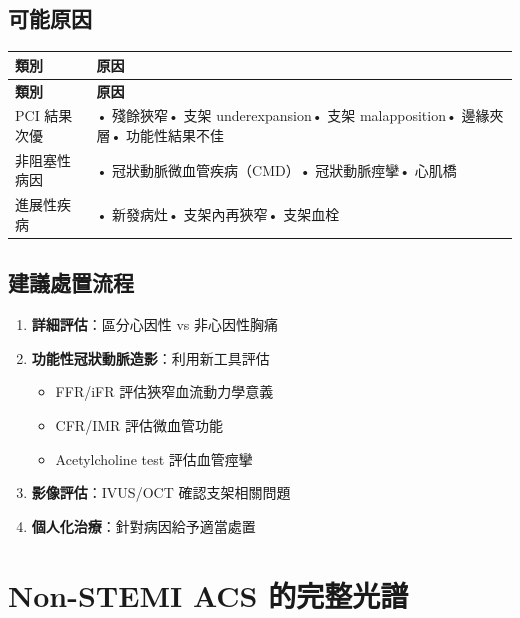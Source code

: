 \documentclass[12pt,a4paper]{article}
\begin{document}
\subsection{可能原因}

\begin{longtable}{p{4cm}p{10cm}}
\toprule
\textbf{類別} & \textbf{原因} \\
\midrule
\endfirsthead
\midrule
\textbf{類別} & \textbf{原因} \\
\midrule
\endhead
\bottomrule
\endfoot
PCI 結果次優 & • 殘餘狹窄\newline • 支架 underexpansion\newline • 支架 malapposition\newline • 邊緣夾層\newline • 功能性結果不佳 \\
\midrule
非阻塞性病因 & • 冠狀動脈微血管疾病（CMD）\newline • 冠狀動脈痙攣\newline • 心肌橋 \\
\midrule
進展性疾病 & • 新發病灶\newline • 支架內再狹窄\newline • 支架血栓 \\
\bottomrule
\end{longtable}

\subsection{建議處置流程}

\begin{enumerate}
    \item \textbf{詳細評估}：區分心因性 vs 非心因性胸痛
    \item \textbf{功能性冠狀動脈造影}：利用新工具評估
    \begin{itemize}
        \item FFR/iFR 評估狹窄血流動力學意義
        \item CFR/IMR 評估微血管功能
        \item Acetylcholine test 評估血管痙攣
    \end{itemize}
    \item \textbf{影像評估}：IVUS/OCT 確認支架相關問題
    \item \textbf{個人化治療}：針對病因給予適當處置
\end{enumerate}

\section{Non-STEMI ACS 的完整光譜}
\end{document}
